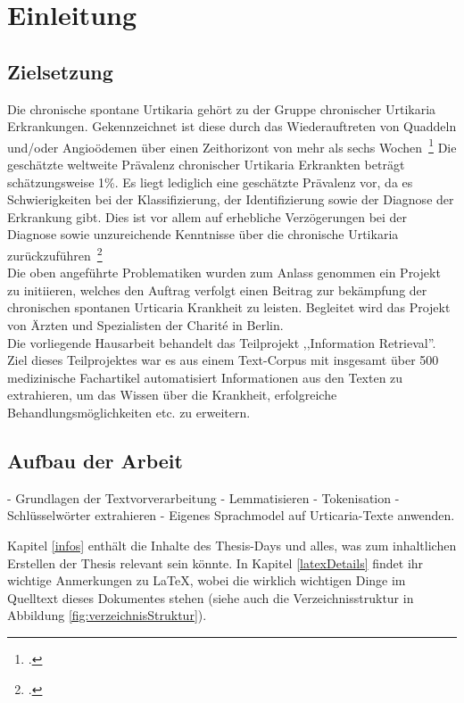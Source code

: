 \section{Einleitung}

\subsection{Zielsetzung}

Die chronische spontane Urtikaria gehört zu der Gruppe chronischer Urtikaria Erkrankungen. Gekennzeichnet ist diese
durch das Wiederauftreten von Quaddeln und/oder Angioödemen über einen Zeithorizont von mehr als sechs
Wochen~\footcite[\vglf][]{savic.2020}
Die geschätzte weltweite Prävalenz chronischer Urtikaria Erkrankten beträgt schätzungsweise 1\%. Es liegt lediglich eine
geschätzte Prävalenz vor, da es Schwierigkeiten bei der Klassifizierung, der Identifizierung sowie der Diagnose der
Erkrankung gibt. Dies ist vor allem auf erhebliche Verzögerungen bei der Diagnose sowie unzureichende Kenntnisse über
die chronische Urtikaria zurückzuführen~\footcite[\vglf][]{savic.2020}\\

Die oben angeführte Problematiken wurden zum Anlass genommen ein Projekt zu initiieren, welches den Auftrag verfolgt
einen Beitrag zur bekämpfung der chronischen spontanen Urticaria Krankheit zu leisten. Begleitet wird das Projekt von
Ärzten und Spezialisten der Charité in Berlin.\\

Die vorliegende Hausarbeit behandelt das Teilprojekt ,,Information Retrieval''. Ziel dieses Teilprojektes war es aus einem
Text-Corpus mit insgesamt über 500 medizinische Fachartikel automatisiert Informationen aus den Texten zu extrahieren,
um das Wissen über die Krankheit, erfolgreiche Behandlungsmöglichkeiten etc. zu erweitern.\\

\subsection{Aufbau der Arbeit}
- Grundlagen der Textvorverarbeitung
- Lemmatisieren
- Tokenisation
- Schlüsselwörter extrahieren
- Eigenes Sprachmodel auf Urticaria-Texte anwenden.

Kapitel \ref{infos} enthält die Inhalte des Thesis-Days und alles, was zum inhaltlichen Erstellen der Thesis relevant sein könnte.
In Kapitel \ref{latexDetails}  findet ihr wichtige Anmerkungen zu \LaTeX{}, wobei die wirklich wichtigen Dinge im Quelltext dieses Dokumentes stehen (siehe auch die Verzeichnisstruktur in Abbildung \ref{fig:verzeichnisStruktur}).

